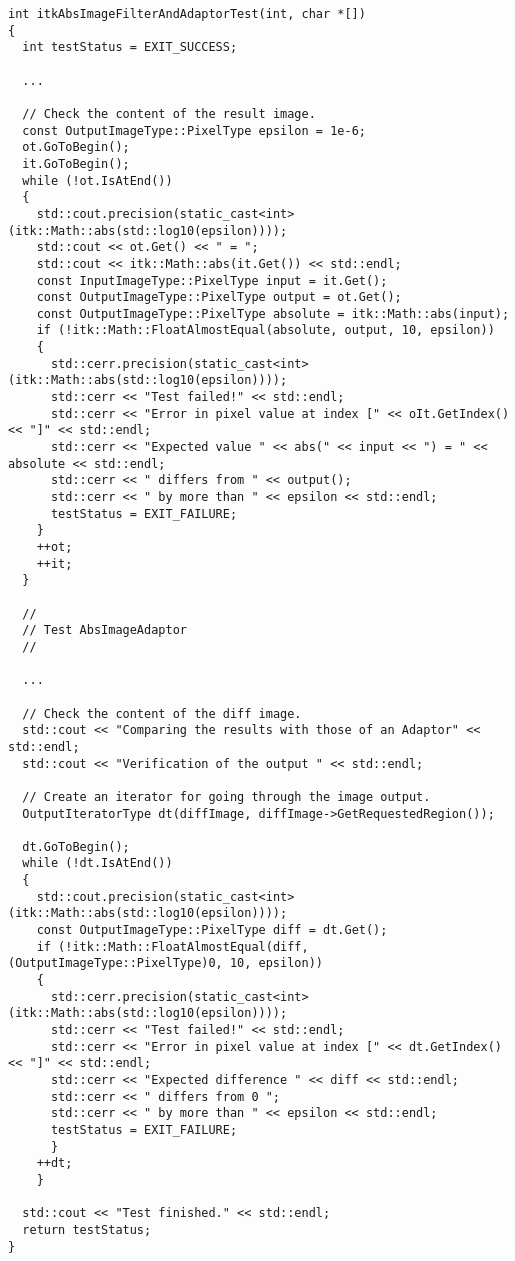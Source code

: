\small
\begin{verbatim}
int itkAbsImageFilterAndAdaptorTest(int, char *[])
{
  int testStatus = EXIT_SUCCESS;

  ...

  // Check the content of the result image.
  const OutputImageType::PixelType epsilon = 1e-6;
  ot.GoToBegin();
  it.GoToBegin();
  while (!ot.IsAtEnd())
  {
    std::cout.precision(static_cast<int>(itk::Math::abs(std::log10(epsilon))));
    std::cout << ot.Get() << " = ";
    std::cout << itk::Math::abs(it.Get()) << std::endl;
    const InputImageType::PixelType input = it.Get();
    const OutputImageType::PixelType output = ot.Get();
    const OutputImageType::PixelType absolute = itk::Math::abs(input);
    if (!itk::Math::FloatAlmostEqual(absolute, output, 10, epsilon))
    {
      std::cerr.precision(static_cast<int>(itk::Math::abs(std::log10(epsilon))));
      std::cerr << "Test failed!" << std::endl;
      std::cerr << "Error in pixel value at index [" << oIt.GetIndex() << "]" << std::endl;
      std::cerr << "Expected value " << abs(" << input << ") = " << absolute << std::endl;
      std::cerr << " differs from " << output();
      std::cerr << " by more than " << epsilon << std::endl;
      testStatus = EXIT_FAILURE;
    }
    ++ot;
    ++it;
  }

  //
  // Test AbsImageAdaptor
  //

  ...

  // Check the content of the diff image.
  std::cout << "Comparing the results with those of an Adaptor" << std::endl;
  std::cout << "Verification of the output " << std::endl;

  // Create an iterator for going through the image output.
  OutputIteratorType dt(diffImage, diffImage->GetRequestedRegion());

  dt.GoToBegin();
  while (!dt.IsAtEnd())
  {
    std::cout.precision(static_cast<int>(itk::Math::abs(std::log10(epsilon))));
    const OutputImageType::PixelType diff = dt.Get();
    if (!itk::Math::FloatAlmostEqual(diff, (OutputImageType::PixelType)0, 10, epsilon))
    {
      std::cerr.precision(static_cast<int>(itk::Math::abs(std::log10(epsilon))));
      std::cerr << "Test failed!" << std::endl;
      std::cerr << "Error in pixel value at index [" << dt.GetIndex() << "]" << std::endl;
      std::cerr << "Expected difference " << diff << std::endl;
      std::cerr << " differs from 0 ";
      std::cerr << " by more than " << epsilon << std::endl;
      testStatus = EXIT_FAILURE;
      }
    ++dt;
    }

  std::cout << "Test finished." << std::endl;
  return testStatus;
}
\end{verbatim}
\normalsize

